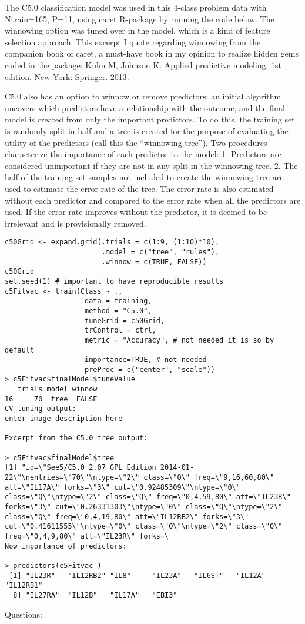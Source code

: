 \documentclass[caret-main.tex]{subfiles}
\begin{document}
The C5.0 classification model was used in this 4-class problem data with Ntrain=165, P=11, using caret R-package by running the code below. The winnowing option was tuned over in the model, which is a kind of feature selection approach. This excerpt I quote regarding winnowing from the companion book of caret, a must-have book in my opinion to realize hidden gems coded in the package:
Kuhn M, Johnson K. Applied predictive modeling. 1st edition. New York: Springer. 2013.

C5.0 also has an option to winnow or remove predictors: an initial algorithm uncovers which predictors have a relationship with the outcome, and the ﬁnal model is created from only the important predictors. To do this, the training set is randomly split in half and a tree is created for the purpose of evaluating the utility of the predictors (call this the “winnowing tree”). Two procedures characterize the importance of each predictor to the model: 1. Predictors are considered unimportant if they are not in any split in the winnowing tree. 2. The half of the training set samples not included to create the winnowing tree are used to estimate the error rate of the tree. The error rate is also estimated without each predictor and compared to the error rate when all the predictors are used. If the error rate improves without the predictor, it is deemed to be irrelevant and is provisionally removed.

\begin{verbatim}
c50Grid <- expand.grid(.trials = c(1:9, (1:10)*10),
                       .model = c("tree", "rules"),
                       .winnow = c(TRUE, FALSE))
c50Grid
set.seed(1) # important to have reproducible results
c5Fitvac <- train(Class ~ .,
                   data = training,
                   method = "C5.0",
                   tuneGrid = c50Grid,
                   trControl = ctrl,
                   metric = "Accuracy", # not needed it is so by default
                   importance=TRUE, # not needed
                   preProc = c("center", "scale"))  
> c5Fitvac$finalModel$tuneValue
   trials model winnow
16     70  tree  FALSE  
CV tuning output:
enter image description here

Excerpt from the C5.0 tree output:

> c5Fitvac$finalModel$tree
[1] "id=\"See5/C5.0 2.07 GPL Edition 2014-01-22\"\nentries=\"70\"\ntype=\"2\" class=\"Q\" freq=\"9,16,60,80\" att=\"IL17A\" forks=\"3\" cut=\"0.92485309\"\ntype=\"0\" class=\"Q\"\ntype=\"2\" class=\"Q\" freq=\"0,4,59,80\" att=\"IL23R\" forks=\"3\" cut=\"0.26331303\"\ntype=\"0\" class=\"Q\"\ntype=\"2\" class=\"Q\" freq=\"0,4,19,80\" att=\"IL12RB2\" forks=\"3\" cut=\"0.41611555\"\ntype=\"0\" class=\"Q\"\ntype=\"2\" class=\"Q\" freq=\"0,4,9,80\" att=\"IL23R\" forks=\   
Now importance of predictors:

> predictors(c5Fitvac )
 [1] "IL23R"   "IL12RB2" "IL8"     "IL23A"   "IL6ST"   "IL12A"   "IL12RB1"
 [8] "IL27RA"  "IL12B"   "IL17A"   "EBI3"
\end{verbatim}Questions:
\end{document}
